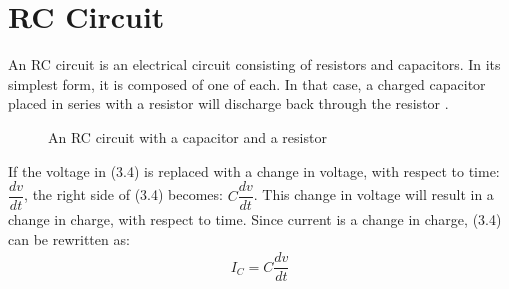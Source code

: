 \section{RC Circuit}
An RC circuit is an electrical circuit consisting of resistors and capacitors. In its simplest form, it is composed of one of each. In that case, a charged capacitor placed in series with a resistor will discharge back through the resistor \cite[p~21]{artof}. 

\begin{figure}[H]
 
 \caption{An RC circuit with a capacitor and a resistor}
\end{figure}

If the voltage in (3.4) is replaced with a change in voltage, with respect to time: $\dfrac{dv}{dt}$, the right side of (3.4) becomes: $C\dfrac{dv}{dt}$. This change in voltage will result in a change in charge, with respect to time. Since current is a change in charge, (3.4) can be rewritten as:
\begin{align}\label{I_C}
I_{C}= C \dfrac{dv}{dt}
\end{align}
